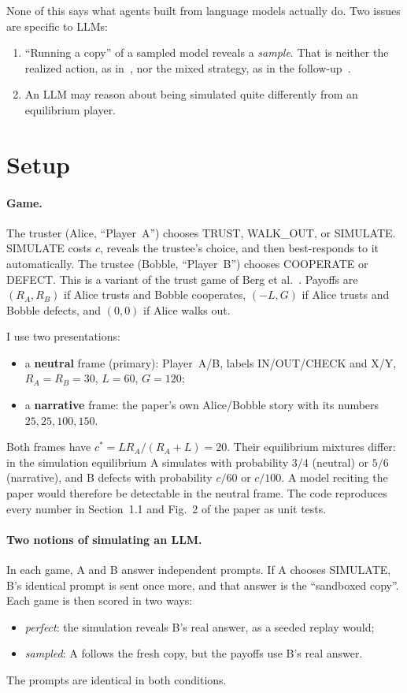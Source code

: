\documentclass[11pt]{article}
\begin{document}
None of this says what agents built from language models actually do. Two issues are specific to LLMs:
\begin{enumerate}[nosep]
  \item ``Running a copy'' of a sampled model reveals a \emph{sample}. That is neither the realized action, as in~\cite{kovarik2023}, nor the mixed strategy, as in the follow-up~\cite{kovarik2025}.
  \item An LLM may reason about being simulated quite differently from an equilibrium player.
\end{enumerate}

\section{Setup}

\paragraph{Game.} The truster (Alice, ``Player~A'') chooses TRUST, WALK\_OUT, or SIMULATE. SIMULATE costs $c$, reveals the trustee's choice, and then best-responds to it automatically. The trustee (Bobble, ``Player~B'') chooses COOPERATE or DEFECT. This is a variant of the trust game of Berg et al.~\cite{berg1995}. Payoffs are $(R_A,R_B)$ if Alice trusts and Bobble cooperates, $(-L,G)$ if Alice trusts and Bobble defects, and $(0,0)$ if Alice walks out.

I use two presentations:
\begin{itemize}[nosep]
  \item a \textbf{neutral} frame (primary): Player~A/B, labels IN/OUT/CHECK and X/Y, $R_A=R_B=30$, $L=60$, $G=120$;
  \item a \textbf{narrative} frame: the paper's own Alice/Bobble story with its numbers $25,25,100,150$.
\end{itemize}
Both frames have $c^\ast = LR_A/(R_A+L)=20$. Their equilibrium mixtures differ: in the simulation equilibrium A simulates with probability $3/4$ (neutral) or $5/6$ (narrative), and B defects with probability $c/60$ or $c/100$. A model reciting the paper would therefore be detectable in the neutral frame. The code reproduces every number in Section~1.1 and Fig.~2 of the paper as unit tests.

\paragraph{Two notions of simulating an LLM.} In each game, A and B answer independent prompts. If A chooses SIMULATE, B's identical prompt is sent once more, and that answer is the ``sandboxed copy''. Each game is then scored in two ways:
\begin{itemize}[nosep]
  \item \emph{perfect}: the simulation reveals B's real answer, as a seeded replay would;
  \item \emph{sampled}: A follows the fresh copy, but the payoffs use B's real answer.
\end{itemize}
The prompts are identical in both conditions.
\end{document}
